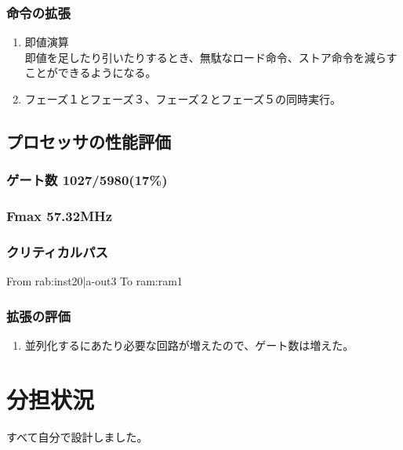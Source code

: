 \documentclass{jarticle}
\begin{document}
\subsubsection{命令の拡張}
\label{sec-2-1-1}
\begin{enumerate}
\item 即値演算\\
\label{sec-2-1-1-1}
即値を足したり引いたりするとき、無駄なロード命令、ストア命令を減らすことができるようになる。
\item フェーズ１とフェーズ３、フェーズ２とフェーズ５の同時実行。\\
\label{sec-2-1-1-2}
\end{enumerate}

\subsection{プロセッサの性能評価}
\label{sec-2-2}
\subsubsection{ゲート数 1027/5980(17\%)}
\label{sec-2-2-1}
\subsubsection{Fmax 57.32MHz}
\label{sec-2-2-2}
\subsubsection{クリティカルパス}
\label{sec-2-2-3}
From rab:inst20|a-out3
To  ram:ram1
\subsubsection{拡張の評価}
\label{sec-2-2-4}
\begin{enumerate}
\item 並列化するにあたり必要な回路が増えたので、ゲート数は増えた。
\label{sec-2-2-4-1}
\end{enumerate}

\section{分担状況}
\label{sec-3}
すべて自分で設計しました。
\end{document}
